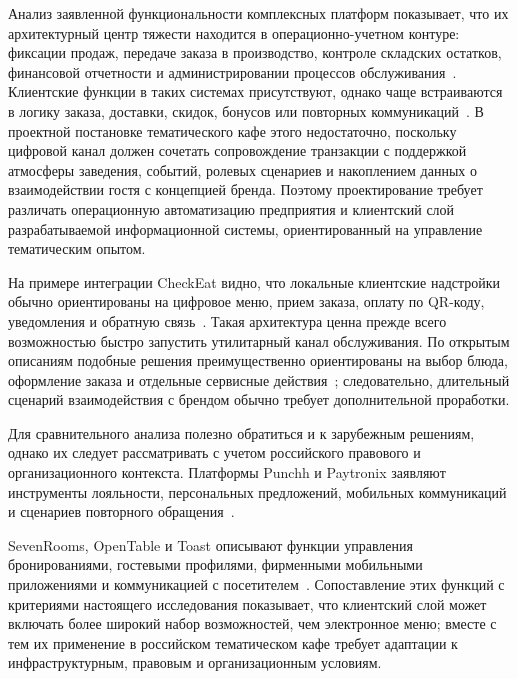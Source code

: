 Анализ заявленной функциональности комплексных платформ показывает, что их архитектурный центр тяжести находится в операционно-учетном контуре: фиксации продаж, передаче заказа в производство, контроле складских остатков, финансовой отчетности и администрировании процессов обслуживания~\cite{iiko_official, rkeeper_official, rkeeper_modules2026}. Клиентские функции в таких системах присутствуют, однако чаще встраиваются в логику заказа, доставки, скидок, бонусов или повторных коммуникаций~\cite{iiko_official, rkeeper_official, rkeeper_modules2026}. В проектной постановке тематического кафе этого недостаточно, поскольку цифровой канал должен сочетать сопровождение транзакции с поддержкой атмосферы заведения, событий, ролевых сценариев и накоплением данных о взаимодействии гостя с концепцией бренда. Поэтому проектирование требует различать операционную автоматизацию предприятия и клиентский слой разрабатываемой информационной системы, ориентированный на управление тематическим опытом.

На примере интеграции CheckEat видно, что локальные клиентские надстройки обычно ориентированы на цифровое меню, прием заказа, оплату по QR-коду, уведомления и обратную связь~\cite{poster_checkeat2026}. Такая архитектура ценна прежде всего возможностью быстро запустить утилитарный канал обслуживания. По открытым описаниям подобные решения преимущественно ориентированы на выбор блюда, оформление заказа и отдельные сервисные действия~\cite{poster_checkeat2026}; следовательно, длительный сценарий взаимодействия с брендом обычно требует дополнительной проработки.

Для сравнительного анализа полезно обратиться и к зарубежным решениям, однако их следует рассматривать с учетом российского правового и организационного контекста. Платформы Punchh и Paytronix заявляют инструменты лояльности, персональных предложений, мобильных коммуникаций и сценариев повторного обращения~\cite{punchh_loyalty2026, paytronix_mobile2026, paytronix_journey2025}.

SevenRooms, OpenTable и Toast описывают функции управления бронированиями, гостевыми профилями, фирменными мобильными приложениями и коммуникацией с посетителем~\cite{sevenrooms_guestexperience2026, opentable_grm2026, toast_brandedapp2026}. Сопоставление этих функций с критериями настоящего исследования показывает, что клиентский слой может включать более широкий набор возможностей, чем электронное меню; вместе с тем их применение в российском тематическом кафе требует адаптации к инфраструктурным, правовым и организационным условиям.

